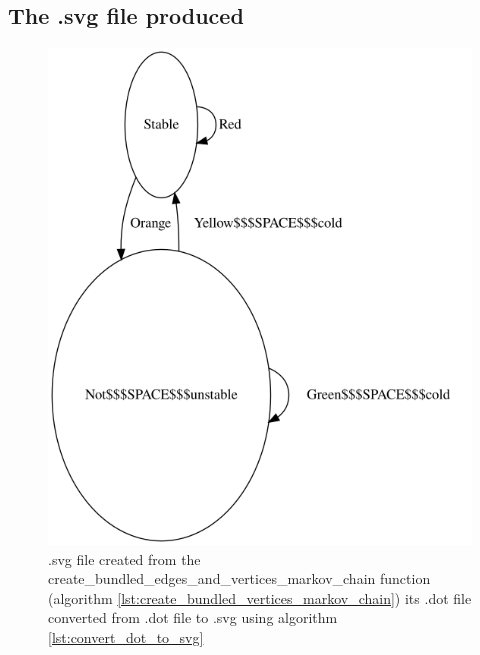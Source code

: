 

\subsection{The .svg file produced}

\begin{figure}[!htbp]
  \includegraphics[]{create_bundled_edges_and_vertices_markov_chain.png}
  \caption{
    .svg file created from the create\_bundled\_edges\_and\_vertices\_markov\_chain function 
    (algorithm  \ref{lst:create_bundled_vertices_markov_chain}) 
    its .dot file converted from .dot file to .svg using algorithm 
    \ref{lst:convert_dot_to_svg}
  }
  \label{fig:create_bundled_edges_and_vertices_markov_chain.svg}
\end{figure}

